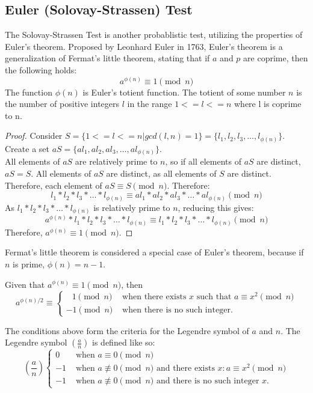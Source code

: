 \documentclass{article}
\begin{document}
\subsection{Euler (Solovay-Strassen) Test} %
The Solovay-Strassen Test is another probablistic test, utilizing the properties of Euler's theorem. Proposed by Leonhard Euler in 1763, Euler's theorem is a generalization of Fermat's little theorem, stating that if $a$ and $p$ are coprime, then the following holds:
\[
    a^{\phi(n)} \equiv 1 \pmod{n}
\]
The function $\phi(n)$ is Euler's totient function. The totient of some number $n$ is the number of positive integers $l$ in the range $1 <= l <= n$ where l is coprime to n.

\begin{proof}
    Consider $S = \{1 <= l <= n | gcd(l, n) = 1\} = \{l_1, l_2, l_3, \ldots{}, l_{\phi(n)}\}$.
    Create a set $aS = \{al_1, al_2, al_3, \ldots{}, al_{\phi(n)}\}$. \\
    All elements of $aS$ are relatively prime to $n$, so if all elements of $aS$ are distinct, $aS = S$. All elements of $aS$ are distinct, as all elements of $S$ are distinct. Therefore, each element of $aS \equiv S \pmod{n}$.
    Therefore:
    \[
        l_1 * l_2 * l_3 * \ldots{} * l_{\phi(n)} \equiv al_1 * al_2 * al_3 * \ldots{} * al_{\phi(n)} \pmod{n}
    \]
    As $l_1 * l_2 * l_3 * \ldots{} * l_{\phi(n)}$ is relatively prime to $n$, reducing this gives:
    \[
        a^{\phi(n)} * l_1 * l_2 * l_3 * \ldots{} * l_{\phi(n)} \equiv l_1 * l_2 * l_3 * \ldots{} * l_{\phi(n)} \pmod{n}
    \]
    Therefore, $a^{\phi(n)} \equiv 1 \pmod{n}$.
\end{proof}

Fermat's little theorem is considered a special case of Euler's theorem, because if $n$ is prime, $\phi(n) = n - 1$.

Given that $a^{\phi(n)} \equiv 1 \pmod{n}$, then 
\[
    a^{\phi(n) / 2} \equiv \begin{cases}
\;\;\,1\pmod{n}& \text{ when there exists }x \text{ such that }a\equiv x^2 \pmod{n}\\
     -1\pmod{n}& \text{ when there is no such integer.}
\end{cases}
\]

The conditions above form the criteria for the Legendre symbol of $a$ and $n$. The Legendre symbol $(\frac{a}{n})$ is defined like so:
\[
    (\frac{a}{n}) \begin{cases}
        0 & \text{ when $a \equiv 0 \pmod{n}$} \\
        -1& \text{ when $a \not\equiv 0 \pmod{n}$ and there exists $x: a \equiv x^2 \pmod{n}$} \\
     -1& \text{ when $a \not\equiv 0 \pmod{n}$ and there is no such integer $x$.}
\end{cases}
\]
\end{document}
